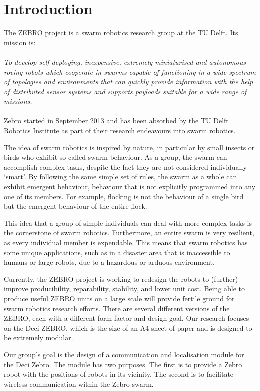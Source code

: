\chapter{Introduction}

The ZEBRO project is a swarm robotics research group at the TU Delft.
Its mission is:
\\\\
\emph{To develop self-deploying, inexpensive, extremely miniaturised and autonomous roving robots which cooperate in swarms capable of functioning in a wide spectrum of topologies and environments that can quickly provide information with the help of distributed sensor systems and supports payloads suitable for a wide range of missions.}
\\\\
Zebro started in September 2013 and has been absorbed by the TU Delft Robotics Institute as part of their research endeavours into swarm robotics.

The idea of swarm robotics is inspired by nature, in particular by small insects or birds who exhibit so-called swarm behaviour.
As a group, the swarm can accomplish complex tasks, despite the fact they are not considered individually `smart'.
By following the same simple set of rules, the swarm as a whole can exhibit emergent behaviour, behaviour that is not explicitly programmed into any one of its members.
For example, flocking is not the behaviour of a single bird but the emergent behaviour of the entire flock.

This idea that a group of simple individuals can deal with more complex tasks is the cornerstone of swarm robotics.
Furthermore, an entire swarm is very resilient, as every individual member is expendable.
This means that swarm robotics has some unique applications, such as in a disaster area that is inaccessible to humans or large robots, due to a hazardous or arduous environment.

Currently, the ZEBRO project is working to redesign the robots to (further) improve producibility, reparability, stability, and lower unit cost.
Being able to produce useful ZEBRO units on a large scale will provide fertile ground for swarm robotics research efforts.
There are several different versions of the ZEBRO, each with a different form factor and design goal.
Our research focuses on the Deci ZEBRO, which is the size of an A4 sheet of paper and is designed to be extremely modular.

Our group's goal is the design of a communication and localisation module for the Deci Zebro.
The module has two purposes.
The first is to provide a Zebro robot with the positions of robots in its vicinity.
The second is to facilitate wireless communication within the Zebro swarm.

